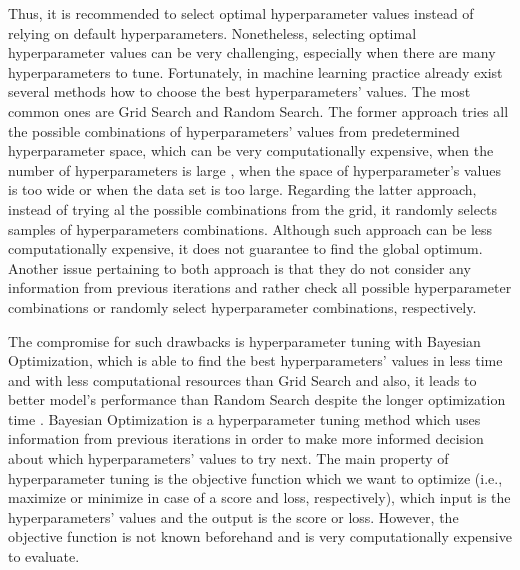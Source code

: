 Thus, it is recommended to select optimal hyperparameter values instead of relying on default hyperparameters.
Nonetheless, selecting optimal hyperparameter values can be very challenging, especially when there are many hyperparameters to tune.
Fortunately, in machine learning practice already exist several methods how to choose the best hyperparameters' values. The most common ones are Grid Search and Random Search.
The former approach tries all the possible combinations of hyperparameters' values from predetermined hyperparameter space, which can be very computationally expensive, when the number of hyperparameters is large \citep{marinov2019hyperparameter}, when the space of hyperparameter's values is too wide or when the data set is too large.
Regarding the latter approach, instead of trying al the possible combinations from the grid, it randomly selects samples of hyperparameters combinations. Although such approach can be less computationally expensive, it does not guarantee to find the global optimum.
Another issue pertaining to both approach is that they do not consider any information from previous iterations and rather check all possible hyperparameter combinations or randomly select hyperparameter combinations, respectively.

The compromise for such drawbacks is hyperparameter tuning with Bayesian Optimization, which is able to find the best hyperparameters' values in less time and with less computational resources than Grid Search and also, it leads to better model's performance than Random Search despite the longer optimization time \citep{drahokoupil2022application}.
Bayesian Optimization is a hyperparameter tuning method which uses information from previous iterations in order to make more informed decision about which hyperparameters' values to try next.
The main property of hyperparameter tuning is the objective function which we want to optimize (i.e., maximize or minimize in case of a score and loss, respectively), which input is the hyperparameters' values and the output is the score or loss. However, the objective function is not known beforehand and is very computationally expensive to evaluate.


